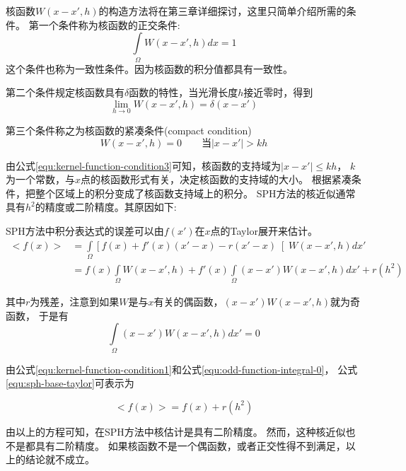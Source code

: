 核函数$W(x-x',h)$的构造方法将在第三章详细探讨，这里只简单介绍所需的条件。
第一个条件称为核函数的正交条件:
\begin{equation}
\label{equ:kernel-function-condition1}
\int\limits_\Omega{}W(x-x',h)dx = 1
\end{equation}
这个条件也称为一致性条件。因为核函数的积分值都具有一致性。

第二个条件规定核函数具有$\delta$函数的特性，当光滑长度$h$接近零时，得到
\begin{equation}
\label{equ:kernel-function-condition2}
\lim_{h \rightarrow 0}W(x-x',h) = \delta(x-x')
\end{equation}

第三个条件称之为核函数的紧凑条件(compact condition)
\begin{equation}
\label{equ:kernel-function-condition3}
W(x-x',h) = 0 \qquad \text{当}|x-x'| > kh
\end{equation}

由公式\ref{equ:kernel-function-condition3}可知，核函数的支持域为$|x-x'|\le{}kh$，
$k$为一个常数，与$x$点的核函数形式有关，决定核函数的支持域的大小。
根据紧凑条件，把整个区域上的积分变成了核函数支持域上的积分。
SPH方法的核近似通常具有$h^2$的精度或二阶精度。其原因如下:

SPH方法中积分表达式的误差可以由$f(x')$在$x$点的Taylor展开来估计。
\begin{equation}
\label{equ:sph-base-taylor}
\begin{aligned}
< f(x) > & = \int\limits_\Omega{}\left[ f(x) + f'(x)(x'-x) -r(x'-x) \right[{} 
			W(x-x',h)dx'\\
		 & = f (x)\int\limits_\Omega{}W(x-x',h)+
		     f'(x)\int\limits_\Omega{}(x-x')W(x-x',h)dx' + r(h^2)
\end{aligned}
\end{equation}


其中$r$为残差，注意到如果$W$是与$x$有关的偶函数，$(x-x')W(x-x',h)$就为奇函数，
于是有
\begin{equation}
\label{equ:odd-function-integral-0}
\int\limits_\Omega{}(x-x')W(x-x',h)dx' = 0
\end{equation}

由公式\ref{equ:kernel-function-condition1}和公式\ref{equ:odd-function-integral-0}，
公式\ref{equ:sph-base-taylor}可表示为

\begin{equation}
\label{equ:shp-function-recursion}
<f(x)> = f(x) +r(h^2)
\end{equation}

由以上的方程可知，在SPH方法中核估计是具有二阶精度。
然而，这种核近似也不是都具有二阶精度。
如果核函数不是一个偶函数，或者正交性得不到满足，以上的结论就不成立。

